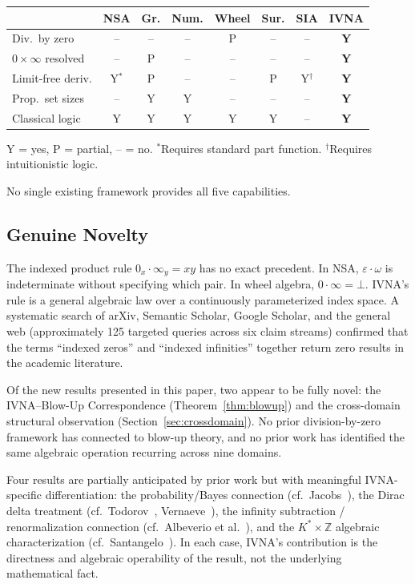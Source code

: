 \documentclass[12pt]{article}
\theoremstyle{definition}
\theoremstyle{remark}
\newcommand{\vz}[1]{0_{#1}}             %
\newcommand{\vi}[1]{\infty_{#1}}        %
\begin{document}
\begin{center}
\begin{tabular}{lccccccc}
\toprule
& NSA & Gr. & Num. & Wheel & Sur. & SIA & \textbf{IVNA} \\
\midrule
Div.\ by zero    & -- & -- & -- & P & -- & -- & \textbf{Y} \\
$0 \times \infty$ resolved & -- & P & -- & -- & -- & -- & \textbf{Y} \\
Limit-free deriv. & Y$^*$ & P & -- & -- & P & Y$^\dagger$ & \textbf{Y} \\
Prop.\ set sizes & -- & Y & Y & -- & -- & -- & \textbf{Y} \\
Classical logic  & Y & Y & Y & Y & Y & -- & \textbf{Y} \\
\bottomrule
\end{tabular}
\end{center}

{\small Y = yes, P = partial, -- = no.
$^*$Requires standard part function.
$^\dagger$Requires intuitionistic logic.}

\medskip
No single existing framework provides all five capabilities.

\subsection{Genuine Novelty}

The indexed product rule $\vz{x} \cdot \vi{y} = xy$ has no exact
precedent. In NSA, $\varepsilon \cdot \omega$ is indeterminate without
specifying which pair. In wheel algebra, $0 \cdot \infty = \bot$.
IVNA's rule is a general algebraic law over a continuously parameterized
index space. A systematic search of arXiv, Semantic Scholar, Google
Scholar, and the general web (approximately 125 targeted queries across
six claim streams) confirmed that the terms ``indexed zeros'' and
``indexed infinities'' together return zero results in the academic
literature.

Of the new results presented in this paper, two appear to be fully
novel: the IVNA--Blow-Up Correspondence (Theorem~\ref{thm:blowup})
and the cross-domain structural observation
(Section~\ref{sec:crossdomain}). No prior division-by-zero framework
has connected to blow-up theory, and no prior work has identified the
same algebraic operation recurring across nine domains.

Four results are partially anticipated by prior work but with
meaningful IVNA-specific differentiation:
the probability/Bayes connection (cf.\ Jacobs~\cite{jacobs2021}),
the Dirac delta treatment (cf.\ Todorov~\cite{todorov1990},
Vernaeve~\cite{vernaeve2025}),
the infinity subtraction / renormalization connection
(cf.\ Albeverio et al.~\cite{albeverio1986}),
and the $K^* \times \mathbb{Z}$ algebraic characterization
(cf.\ Santangelo~\cite{santangelo2016}).
In each case, IVNA's contribution is the directness and algebraic
operability of the result, not the underlying mathematical fact.
\end{document}
